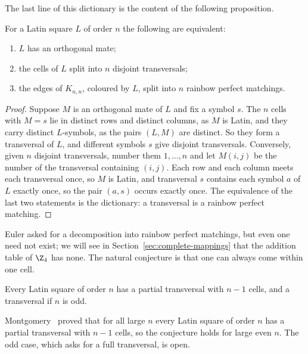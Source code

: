 The last line of this dictionary is the content of the following proposition.

\begin{proposition}\label{prop:mate}
For a Latin square $L$ of order $n$ the following are equivalent:
\begin{enumerate}
\item $L$ has an orthogonal mate;
\item the cells of $L$ split into $n$ disjoint transversals;
\item the edges of $K_{n,n}$, coloured by $L$, split into $n$ rainbow perfect matchings.
\end{enumerate}
\end{proposition}

\begin{proof}
Suppose $M$ is an orthogonal mate of $L$ and fix a symbol $s$. The $n$ cells with $M=s$ lie in distinct rows and distinct columns, as $M$ is Latin, and they carry distinct $L$-symbols, as the pairs $(L,M)$ are distinct. So they form a transversal of $L$, and different symbols $s$ give disjoint transversals. Conversely, given $n$ disjoint transversals, number them $1,\dots,n$ and let $M(i,j)$ be the number of the transversal containing $(i,j)$. Each row and each column meets each transversal once, so $M$ is Latin, and transversal $s$ contains each symbol $a$ of $L$ exactly once, so the pair $(a,s)$ occurs exactly once. The equivalence of the last two statements is the dictionary: a transversal is a rainbow perfect matching.
\end{proof}


Euler asked for a decomposition into rainbow perfect matchings, but even one need not exist; we will see in Section~\ref{sec:complete-mappings} that the addition table of $\Z_4$ has none. The natural conjecture is that one can always come within one cell.

\begin{conjecture}\label{conj:rbs}
Every Latin square of order $n$ has a partial transversal with $n-1$ cells, and a transversal if $n$ is odd.
\end{conjecture}

Montgomery~\cite{mon23} proved that for all large $n$ every Latin square of order $n$ has a partial transversal with $n-1$ cells, so the conjecture holds for large even $n$. The odd case, which asks for a full transversal, is open.
